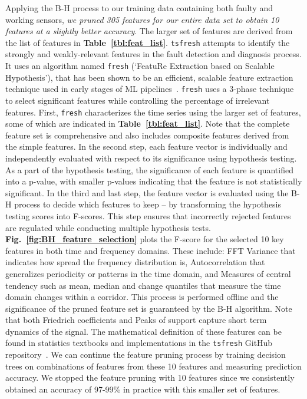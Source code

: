 Applying the B-H process to our training data containing both faulty and working sensors, \emph{we pruned 305 features for our entire data set to obtain 10 features at a slightly better accuracy}. The larger set of features are derived from the list of features in {\bfseries Table~\ref{tbl:feat_list}}. \texttt{tsfresh} attempts to identify the strongly and weakly-relevant features in the fault detection and diagnosis process. It uses an algorithm named \texttt{fresh} (`FeatuRe Extraction based on Scalable Hypothesis'), that has been shown to be an efficient, scalable feature extraction technique used in early stages of ML pipelines~\cite{christ2016distributed, christ2018time}. \texttt{fresh} uses a 3-phase technique to select significant features while controlling the percentage of irrelevant features. First, \texttt{fresh} characterizes the time series using the larger set of features, some of which are indicated in {\bfseries Table~\ref{tbl:feat_list}}. Note that the complete feature set is comprehensive and also includes composite features derived from the simple features. In the second step, each feature vector is individually and independently evaluated with respect to its significance using hypothesis testing. As a part of the hypothesis testing, the significance of each feature is quantified into a p-value, with smaller p-values indicating that the feature is not statistically significant. In the third and last step, the feature vector is evaluated using the B-H process to decide which features to keep -- by transforming the hypothesis testing scores into F-scores. This step ensures that incorrectly rejected features are regulated while conducting multiple hypothesis tests. {\bfseries Fig.~\ref{fig:BH_feature_selection}} plots the F-score for the selected 10 key features in both time and frequency domains. These include: \ca FFT Variance that indicates how spread the frequency distribution is, \cb Autocorrelation that generalizes periodicity or patterns in the time domain, and \cc  Measures of central tendency such as mean, median and change quantiles that measure the time domain changes within a corridor. This process is performed offline and the significance of the pruned feature set is guaranteed by the B-H algorithm. Note that both Friedrich coefficients and Peaks of support capture short term dynamics of the signal. The mathematical definition of these features can be found in statistics textbooks and implementations in the \texttt{tsfresh} GitHub repository~\cite{tsfresh2018code}. We can continue the feature pruning process by training decision trees on combinations of features from these 10 features and measuring prediction accuracy. We stopped the feature pruning with 10 features since we consistently obtained an accuracy of 97-99\% in practice with this smaller set of features.%


